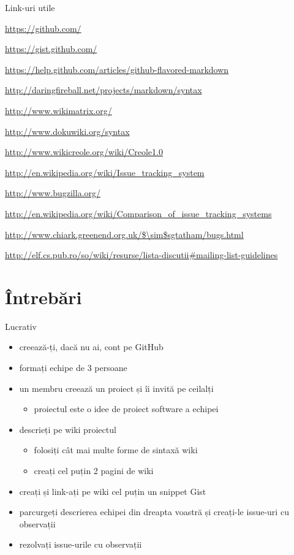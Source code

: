 \documentclass{beamer}
\begin{document}
\begin{frame}{Link-uri utile}
  \begin{itemize}
    {\footnotesize
    \item \url{https://github.com/}
    \item \url{https://gist.github.com/}
    \item \url{https://help.github.com/articles/github-flavored-markdown}
    \item \url{http://daringfireball.net/projects/markdown/syntax}
    \item \url{http://www.wikimatrix.org/}
    \item \url{http://www.dokuwiki.org/syntax}
    \item \url{http://www.wikicreole.org/wiki/Creole1.0}
    \item \url{http://en.wikipedia.org/wiki/Issue\_tracking\_system}
    \item \url{http://www.bugzilla.org/}
    \item
\url{http://en.wikipedia.org/wiki/Comparison\_of\_issue\_tracking\_systems}
    \item \url{http://www.chiark.greenend.org.uk/$\sim$sgtatham/bugs.html}
    \item
      \url{http://elf.cs.pub.ro/so/wiki/resurse/lista-discutii\#mailing-list-guidelines}
    }
  \end{itemize}
\end{frame}

\section{Întrebări}

\begin{frame}{Lucrativ}
  \begin{itemize}
    \pause \item creează-ți, dacă nu ai, cont pe GitHub
    \pause \item formați echipe de 3 persoane
    \pause \item un membru creează un proiect și îi invită pe ceilalți
      \begin{itemize}
        \item proiectul este o idee de proiect software a echipei
      \end{itemize}
    \pause \item descrieți pe wiki proiectul
      \begin{itemize}
        \item folosiți cât mai multe forme de sintaxă wiki
        \item creați cel puțin 2 pagini de wiki
      \end{itemize}
    \pause \item creați și link-ați pe wiki cel puțin un snippet Gist
    \pause \item parcurgeți descrierea echipei din dreapta voastră și creați-le
      issue-uri cu observații
    \pause \item rezolvați issue-urile cu observații
  \end{itemize}
\end{frame}
\end{document}
